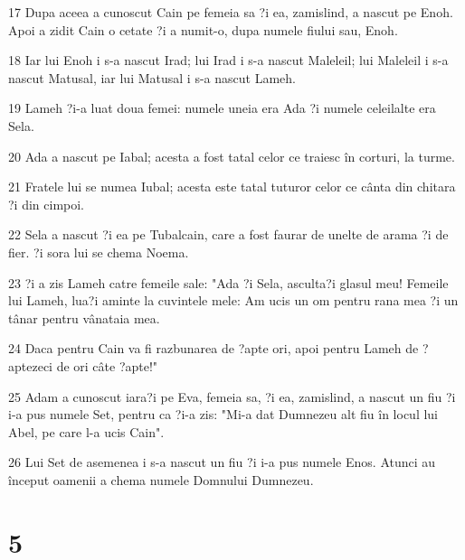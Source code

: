 \par 17 Dupa aceea a cunoscut Cain pe femeia sa ?i ea, zamislind, a nascut pe Enoh. Apoi a zidit Cain o cetate ?i a numit-o, dupa numele fiului sau, Enoh.
\par 18 Iar lui Enoh i s-a nascut Irad; lui Irad i s-a nascut Maleleil; lui Maleleil i s-a nascut Matusal, iar lui Matusal i s-a nascut Lameh.
\par 19 Lameh ?i-a luat doua femei: numele uneia era Ada ?i numele celeilalte era Sela.
\par 20 Ada a nascut pe Iabal; acesta a fost tatal celor ce traiesc în corturi, la turme.
\par 21 Fratele lui se numea Iubal; acesta este tatal tuturor celor ce cânta din chitara ?i din cimpoi.
\par 22 Sela a nascut ?i ea pe Tubalcain, care a fost faurar de unelte de arama ?i de fier. ?i sora lui se chema Noema.
\par 23 ?i a zis Lameh catre femeile sale: "Ada ?i Sela, asculta?i glasul meu! Femeile lui Lameh, lua?i aminte la cuvintele mele: Am ucis un om pentru rana mea ?i un tânar pentru vânataia mea.
\par 24 Daca pentru Cain va fi razbunarea de ?apte ori, apoi pentru Lameh de ?aptezeci de ori câte ?apte!"
\par 25 Adam a cunoscut iara?i pe Eva, femeia sa, ?i ea, zamislind, a nascut un fiu ?i i-a pus numele Set, pentru ca ?i-a zis: "Mi-a dat Dumnezeu alt fiu în locul lui Abel, pe care l-a ucis Cain".
\par 26 Lui Set de asemenea i s-a nascut un fiu ?i i-a pus numele Enos. Atunci au început oamenii a chema numele Domnului Dumnezeu.

\chapter{5}

